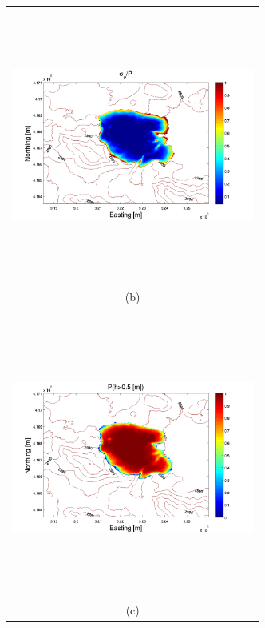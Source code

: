 \documentclass[12pt]{article}
\newcommand{\Pic}[2][0.85]{\begin{center}\texttt{[image: \#2]}
 \end{center} }
\begin{document}
\begin{figure}[H]
\begin{minipage}{0.6\textwidth}
\begin{tabular}{c}
	\includegraphics[width=8cm,height=9cm,keepaspectratio]{Mammoth_0_sigma.pdf}\\
        (b)
        \end{tabular}
    \end{minipage} 
        \begin{minipage}[b]{0.6\textwidth}
        \begin{tabular}{c}
       \includegraphics[width=8cm,height=9cm,keepaspectratio]{Mammoth_3_P.pdf}\\
        (c)
        \end{tabular}
    \end{minipage}
    \begin{minipage}{0.6\textwidth}
        \begin{tabular}{c}

\end{tabular}
\end{minipage}
\end{figure}
\end{document}
